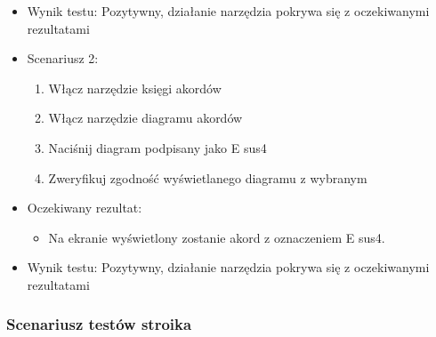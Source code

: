 \begin{itemize}
\begin{itemize}
        \end{itemize}
    \item Wynik testu: Pozytywny, działanie narzędzia pokrywa się z oczekiwanymi rezultatami
    \item Scenariusz 2:
        \begin{enumerate}
            \item Włącz narzędzie księgi akordów
            \item Włącz narzędzie diagramu akordów
            \item Naciśnij diagram podpisany jako E sus4
            \item Zweryfikuj zgodność wyświetlanego diagramu z wybranym
        \end{enumerate}
    \item Oczekiwany rezultat:
        \begin{itemize}
            \item Na ekranie wyświetlony zostanie akord z oznaczeniem E sus4.
        \end{itemize}
    \item Wynik testu: Pozytywny, działanie narzędzia pokrywa się z oczekiwanymi rezultatami
\end{itemize}

\subsubsection{Scenariusz testów stroika}

